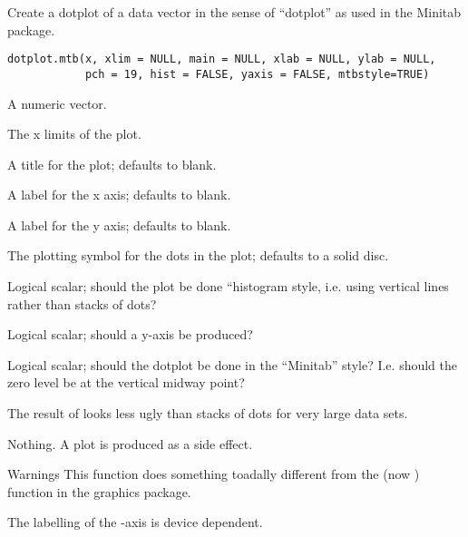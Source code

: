 \begin{Description}\relax
Create a dotplot of a data vector in the sense of ``dotplot'' as
used in the Minitab\eqn{\mbox{\copyright}}{} package.
\end{Description}
\begin{Usage}
\begin{verbatim}
dotplot.mtb(x, xlim = NULL, main = NULL, xlab = NULL, ylab = NULL,
            pch = 19, hist = FALSE, yaxis = FALSE, mtbstyle=TRUE)
\end{verbatim}
\end{Usage}
\begin{Arguments}
\begin{ldescription}
\item[\code{x}] A numeric vector. 
\item[\code{xlim}] The x limits of the plot. 
\item[\code{main}] A title for the plot; defaults to blank.
\item[\code{xlab}] A label for the x axis; defaults to blank.
\item[\code{ylab}] A label for the y axis; defaults to blank.
\item[\code{pch}] The plotting symbol for the dots in the plot;
defaults to a solid disc. 
\item[\code{hist}] Logical scalar; should the plot be done ``histogram
style, i.e. using vertical lines rather than stacks
of dots?
\item[\code{yaxis}] Logical scalar; should a y-axis be produced? 
\item[\code{mtbstyle}] Logical scalar; should the dotplot be done in
the ``Minitab'' style?  I.e. should the zero level
be at the vertical midway point? 
\end{ldescription}
\end{Arguments}
\begin{Details}\relax
The result of  looks less ugly than stacks of
dots for very large data sets.
\end{Details}
\begin{Value}
Nothing.  A plot is produced as a side effect.
\end{Value}
\begin{Section}{Warnings}
This function does something toadally different from the 
(now ) function in the graphics package.

The labelling of the -axis is device dependent.
\end{Section}
